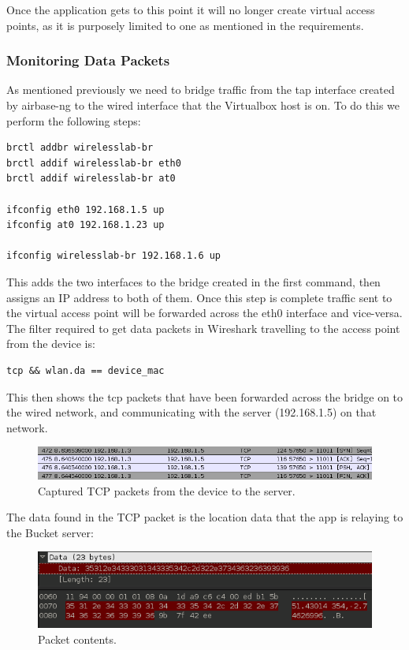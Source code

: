 Once the application gets to this point it will no longer create virtual access points, as it is purposely limited to one as mentioned in the requirements.

\subsubsection{Monitoring Data Packets}
As mentioned previously we need to bridge traffic from the tap interface created by airbase-ng to the wired interface that the Virtualbox host is on. To do this we perform the following steps:

\begin{verbatim}
brctl addbr wirelesslab-br
brctl addif wirelesslab-br eth0
brctl addif wirelesslab-br at0

ifconfig eth0 192.168.1.5 up
ifconfig at0 192.168.1.23 up

ifconfig wirelesslab-br 192.168.1.6 up
\end{verbatim}

This adds the two interfaces to the bridge created in the first command, then assigns an IP address to both of them. Once this step is complete traffic sent to the virtual access point will be forwarded across the eth0 interface and vice-versa.
\clearpage
 The filter required to get data packets in Wireshark travelling to the access point from the device is:

\begin{verbatim}
tcp && wlan.da == device_mac
\end{verbatim}

This then shows the tcp packets that have been forwarded across the bridge on to the wired network, and communicating with the server (192.168.1.5) on that network.

\begin{figure}[h!]
\centering\includegraphics[width=\linewidth]{implementation/figures/wireshark captured.png}
\caption{Captured TCP packets from the device to the server.}
\end{figure}

The data found in the TCP packet is the location data that the app is relaying to the Bucket server:

\begin{figure}[h!]
\centering\includegraphics[width=\linewidth]{implementation/figures/wireshark-data.png}
\caption{Packet contents.}
\end{figure}


